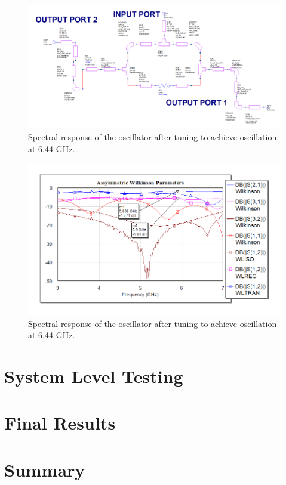 \documentclass[reprint, aps, prl]{revtex4-1}
\begin{document}
\begin{figure}[!htbp]
    \centering
    \includegraphics[scale=0.35]{Unbalanced_Wilkinson_Schematic.png}
    \caption{Spectral response of the oscillator after tuning to achieve oscillation at 6.44 GHz.}
    \label{fig:AsWilkSchematic}
\end{figure}

\begin{figure}[!htbp]
    \centering
    \includegraphics[scale=0.35]{Unbalanced_Wilkinson_Meas}
    \caption{Spectral response of the oscillator after tuning to achieve oscillation at 6.44 GHz.}
    \label{fig:AsWilkMeas}
\end{figure}




\section*{System Level Testing}


\section*{Final Results}


\section*{Summary}
\end{document}
